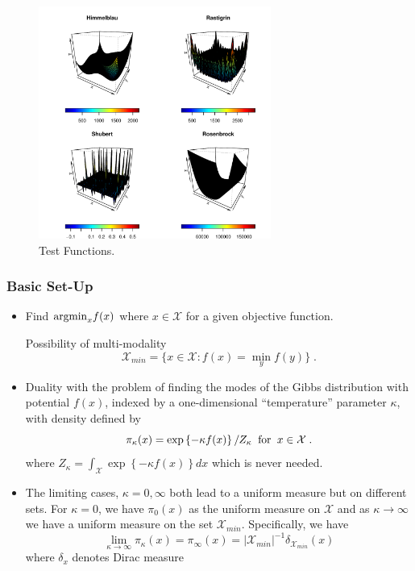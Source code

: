 \documentclass[notes=show,smaller]{beamer}
\begin{document}
\begin{frame}


\begin{figure}[hbp]
\includegraphics[height=3in,width=\textwidth]{john-plots-1.pdf}
\caption{Test Functions.}
\end{figure}

\end{frame}
\begin{frame}
\frametitle{Basic Set-Up}


\footnotesize
\begin{itemize}
\item Find $ {\rm arg min}_x f(x)$ where $ x \in \mathcal{X} $ for a given objective function.

Possibility of multi-modality
$$
\mathcal{X}_{min} = \{  x \in \mathcal{X} : f( x) = \min_y f(y) \} \; .
$$
\item Duality with the problem of finding the modes of the Gibbs distribution with potential $f(x)$, indexed by a one-dimensional ``temperature'' parameter $\kappa$,
with density defined by
$$
\pi_\kappa (x) = \exp \left \{ - \kappa f(x) \right \} / Z_\kappa \; \; {\rm for} \; \; x \in \mathcal{X} \; .
$$
where
$ Z_\kappa = \int_{\mathcal{X}}  \exp \left \{ - \kappa f(x) \right \} d x $ which is never needed.

\item The limiting cases, $ \kappa =0 , \infty$ both lead to a uniform measure but on different sets.
For $ \kappa =0 $, we have $ \pi_0 (x) $ as the uniform measure on $ \mathcal{X} $ and as $ \kappa \rightarrow \infty $
we have a uniform measure on the set $ \mathcal{X}_{min} $. Specifically, we have
$$
\lim_{ \kappa \rightarrow \infty } \pi_\kappa (x) = \pi_{\infty} ( x ) = | \mathcal{X}_{min} |^{-1} \delta_{ \mathcal{X}_{min} } (x)
$$
where $ \delta_x$ denotes Dirac measure
\end{itemize}
\normalsize

\end{frame}
\end{document}
